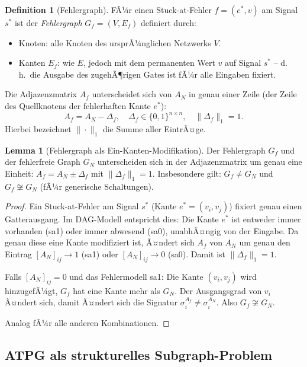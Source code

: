 ﻿\documentclass[a4paper,12pt]{article}
\theoremstyle{definition}
\newtheorem{definition}{Definition}
\newtheorem{lemma}{Lemma}
\begin{document}
\begin{definition}[Fehlergraph]\label{def:fehlergraph}
  FÃ¼r einen Stuck-at-Fehler $f = (e^*, v)$ am Signal $s^*$ ist der \emph{Fehlergraph}
  $G_f = (V, E_f)$ definiert durch:
  \begin{itemize}
    \item Knoten: alle Knoten des ursprÃ¼nglichen Netzwerks $V$.
    \item Kanten $E_f$: wie $E$, jedoch mit dem permanenten Wert $v$ auf Signal $s^*$
          -- d.\,h.\ die Ausgabe des zugehÃ¶rigen Gates ist fÃ¼r alle Eingaben fixiert.
  \end{itemize}
  Die Adjazenzmatrix $A_f$ unterscheidet sich von $A_N$ in genau einer Zeile (der
  Zeile des Quellknotens der fehlerhaften Kante $e^*$):
  \[
    A_f = A_N - \Delta_f, \quad
    \Delta_f \in \{0,1\}^{n \times n}, \quad \|\Delta_f\|_1 = 1.
  \]
  Hierbei bezeichnet $\|\cdot\|_1$ die Summe aller EintrÃ¤ge.
\end{definition}

\begin{lemma}[Fehlergraph als Ein-Kanten-Modifikation]\label{lemma:fehlergraph}
  Der Fehlergraph $G_f$ und der fehlerfreie Graph $G_N$ unterscheiden sich in der
  Adjazenzmatrix um genau eine Einheit: $A_f = A_N \pm \Delta_f$ mit $\|\Delta_f\|_1 = 1$.
  Insbesondere gilt: $G_f \neq G_N$ und $G_f \not\cong G_N$ (fÃ¼r generische Schaltungen).
\end{lemma}

\begin{proof}
  Ein Stuck-at-Fehler am Signal $s^*$ (Kante $e^* = (v_i, v_j)$) fixiert genau einen
  Gatterausgang. Im DAG-Modell entspricht dies: Die Kante $e^*$ ist entweder immer
  vorhanden (sa1) oder immer abwesend (sa0), unabhÃ¤ngig von der Eingabe. Da genau
  diese eine Kante modifiziert ist, Ã¤ndert sich $A_f$ von $A_N$ um genau den Eintrag
  $[A_N]_{ij} \to 1$ (sa1) oder $[A_N]_{ij} \to 0$ (sa0). Damit ist $\|\Delta_f\|_1 = 1$.

  Falls $[A_N]_{ij} = 0$ und das Fehlermodell sa1: Die Kante $(v_i, v_j)$ wird hinzugefÃ¼gt,
  $G_f$ hat eine Kante mehr als $G_N$. Der Ausgangsgrad von $v_i$ Ã¤ndert sich, damit
  Ã¤ndert sich die Signatur $\sigma_i^{A_f} \neq \sigma_i^{A_N}$. Also $G_f \not\cong G_N$.

  Analog fÃ¼r alle anderen Kombinationen.
\end{proof}

\subsection{ATPG als strukturelles Subgraph-Problem}
\end{document}

